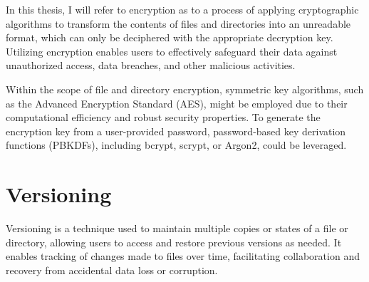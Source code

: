 In this thesis, I will refer to encryption as to a process of applying cryptographic algorithms to transform the contents of files and directories into an unreadable format, which can only be deciphered with the appropriate decryption key.
Utilizing encryption enables users to effectively safeguard their data against unauthorized access, data breaches, and other malicious activities.

Within the scope of file and directory encryption, symmetric key algorithms, such as the Advanced Encryption Standard (AES), might be employed due to their computational efficiency and robust security properties.
To generate the encryption key from a user-provided password, password-based key derivation functions (PBKDFs), including bcrypt, scrypt, or Argon2, could be leveraged.

\section{Versioning}\label{sec:versioning}

Versioning is a technique used to maintain multiple copies or states of a file or directory, allowing users to access and restore previous versions as needed.
It enables tracking of changes made to files over time, facilitating collaboration and recovery from accidental data loss or corruption.